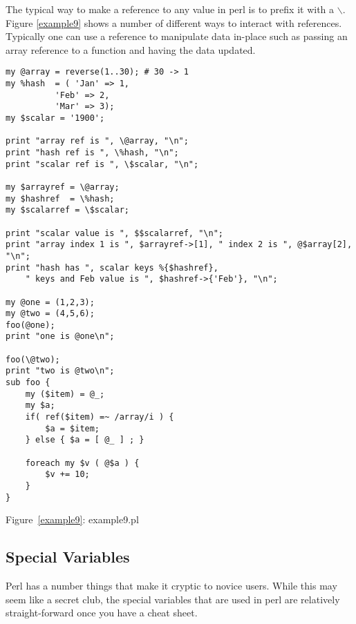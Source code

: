 \documentclass{article}
\begin{document}
\par
The typical way to make a reference to any value in perl is to prefix
it with a $\backslash$.  Figure \ref{example9} shows a number of
different ways to interact with references.  Typically one can use a
reference to manipulate data in-place such as passing an array
reference to a function and having the data updated.

\begin{verbatim}
my @array = reverse(1..30); # 30 -> 1 
my %hash  = ( 'Jan' => 1,
	      'Feb' => 2,
	      'Mar' => 3);
my $scalar = '1900';

print "array ref is ", \@array, "\n";
print "hash ref is ", \%hash, "\n";
print "scalar ref is ", \$scalar, "\n";

my $arrayref = \@array;
my $hashref  = \%hash;
my $scalarref = \$scalar;

print "scalar value is ", $$scalarref, "\n";
print "array index 1 is ", $arrayref->[1], " index 2 is ", @$array[2], "\n";
print "hash has ", scalar keys %{$hashref}, 
    " keys and Feb value is ", $hashref->{'Feb'}, "\n";

my @one = (1,2,3);
my @two = (4,5,6);
foo(@one);
print "one is @one\n";

foo(\@two);
print "two is @two\n";
sub foo {
    my ($item) = @_;
    my $a;
    if( ref($item) =~ /array/i ) { 
        $a = $item;
    } else { $a = [ @_ ] ; }

    foreach my $v ( @$a ) {
        $v += 10;
    }
}
\end{verbatim}
\label{example9}
\begin{center}{Figure~\ref{example9}: example9.pl}\end{center}

\subsection{Special Variables}

Perl has a number things that make it cryptic to novice users.  While
this may seem like a secret club, the special variables that are used
in perl are relatively straight-forward once you have a cheat sheet.

\end{document}
